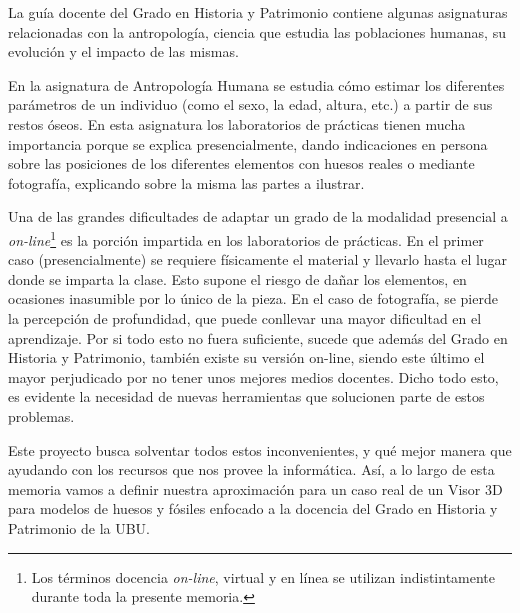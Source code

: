 
La guía docente del Grado en Historia y Patrimonio contiene algunas asignaturas relacionadas con la antropología, ciencia que estudia las poblaciones humanas, su evolución y el impacto de las mismas.

En la asignatura de Antropología Humana se estudia cómo estimar los diferentes parámetros de un individuo (como el sexo, la edad, altura, etc.) a partir de sus restos óseos. En esta asignatura los laboratorios de prácticas tienen mucha importancia porque se explica presencialmente, dando indicaciones en persona sobre las posiciones de los diferentes elementos con huesos reales o mediante fotografía, explicando sobre la misma las partes a ilustrar.

Una de las grandes dificultades de adaptar un grado de la modalidad presencial a \textit{on-line}\footnote{Los términos docencia \textit{on-line}, virtual y en línea se utilizan indistintamente durante toda la presente memoria.} es la porción impartida en los laboratorios de prácticas. En el primer caso (presencialmente) se requiere físicamente el material y llevarlo hasta el lugar donde se imparta la clase. Esto supone el riesgo de dañar los elementos, en ocasiones inasumible por lo único de la pieza. En el caso de fotografía, se pierde la percepción de profundidad, que puede conllevar una mayor dificultad en el aprendizaje. Por si todo esto no fuera suficiente, sucede que además del Grado en Historia y Patrimonio, también existe su versión on-line, siendo este último el mayor perjudicado por no tener unos mejores medios docentes. Dicho todo esto, es evidente la necesidad de nuevas herramientas que solucionen parte de estos problemas.

Este proyecto busca solventar todos estos inconvenientes, y qué mejor manera que ayudando con los recursos que nos provee la informática. Así, a lo largo de esta memoria vamos a definir nuestra aproximación para un caso real de un Visor 3D para modelos de huesos y fósiles enfocado a la docencia del Grado en Historia y Patrimonio de la UBU.
